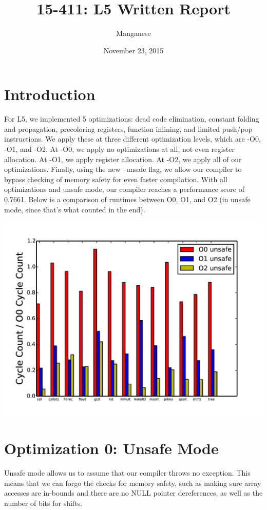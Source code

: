 \documentclass{article}
\title{15-411: L5 Written Report}
\author{Manganese}
\date{November 23, 2015}
\begin{document}
\maketitle

\section{Introduction}

For L5, we implemented 5 optimizations: dead code elimination, constant folding and propagation, precoloring registers, function inlining, and limited push/pop instructions. We apply these at three different optimization levels, which are -O0, -O1, and -O2. At -O0, we apply no optimizations at all, not even register allocation. At -O1, we apply register allocation. At -O2, we apply all of our optimizations. Finally, using the new --unsafe flag, we allow our compiler to bypass checking of memory safety for even faster compilation. With all optimizations and unsafe mode, our compiler reaches a performance score of 0.7661. Below is a comparison of runtimes between O0, O1, and O2 (in unsafe mode, since that's what counted in the end).

\includegraphics[scale=0.5]{O0-O1-O2_unsafe-page-001}

\section{Optimization 0: Unsafe Mode}

Unsafe mode allows us to assume that our compiler throws no exception. This means that we can forgo the checks for memory safety, such as making sure array accesses are in-bounds and there are no NULL pointer dereferences, as well as the number of bits for shifts. 
\end{document}

